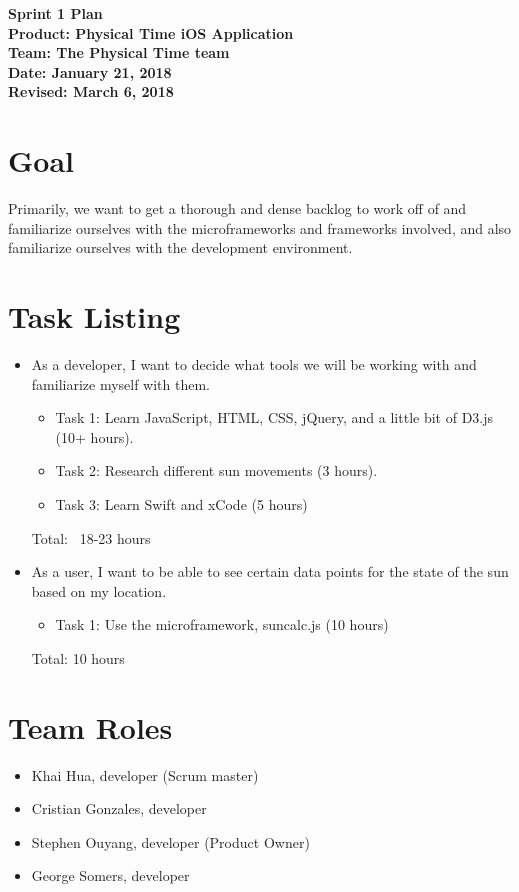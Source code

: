 \documentclass[11pt]{article}
\newcommand\tab[1][1cm]{\hspace*{#1}}
\begin{document}
	\Large{\textbf{Sprint 1 Plan}}\\
	\Large{\textbf{Product: Physical Time iOS Application}}\\
	\Large{\textbf{Team: The Physical Time team}}\\
	\Large{\textbf{Date: January 21, 2018}}\\
	\Large{\textbf{Revised: March 6, 2018}}\\

	\vspace{-3mm}

	\section{Goal}
		\vspace{-3mm}
		\tab \normalsize{Primarily, we want to get a thorough and dense backlog to work off of and familiarize ourselves with the microframeworks and frameworks involved, and also familiarize ourselves with the development environment.}

	\section{Task Listing}
		\vspace{-3mm}
		\begin{itemize}
			\item As a developer, I want to decide what tools we will be working with and familiarize myself with them.
			\begin{itemize}
			    \item Task 1: Learn JavaScript, HTML, CSS, jQuery, and a little bit of D3.js (10+ hours).
			    \item Task 2: Research different sun movements (3 hours).
				\item Task 3: Learn Swift and xCode (5 hours)
			\end{itemize}
			Total: ~18-23 hours
			\item As a user, I want to be able to see certain data points for the state of the sun based on my location.
			\begin{itemize}
			    \item Task 1: Use the microframework, suncalc.js (10 hours)
			\end{itemize}
			Total: 10 hours
		\end{itemize}

	\section{Team Roles}
		\vspace{-3mm}
		\begin{itemize}
		    \item Khai Hua, developer (Scrum master)
		    \item Cristian Gonzales, developer
		    \item Stephen Ouyang, developer (Product Owner)
		    \item George Somers, developer
		\end{itemize}
\end{document}
